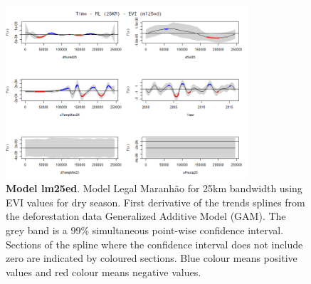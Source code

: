 \begin{table}

\begin{figure}[H]
 \centering
        \centering
        \includegraphics[width=0.8\textwidth]{ml25ed.png} %
        \caption[Model Legal Maranhão for 25km bandwidth using EVI values for dry season. First derivative of the trends splines from the deforestation data Generalized Additive Model (GAM)]{\textbf{Model lm25ed}. Model Legal Maranhão for 25km bandwidth using EVI values for dry season. First derivative of the trends splines from the deforestation data Generalized Additive Model (GAM). The grey band is a 99\% simultaneous point-wise confidence interval. Sections of the spline where the confidence interval does not include zero are indicated by coloured sections. Blue colour means positive values and red colour means negative values.}
        \centering
\end{figure}
\end{table}
